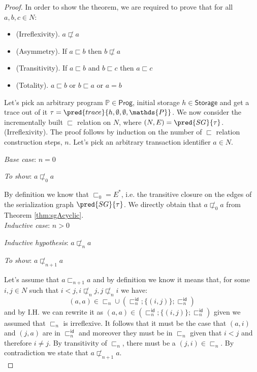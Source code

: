 \begin{proof}
In order to show the theorem, we are required to prove that for all $a, b, c \in N$:
\begin{itemize}
	\item (Irreflexivity). $a \not\sqsubset a$
	\item (Asymmetry). If $a \sqsubset b$ then $b \not\sqsubset a$
	\item (Transitivity). If $a \sqsubset b$ and $b \sqsubset c$ then $a \sqsubset c$
	\item (Totality). $a \sqsubset b$ or $b \sqsubset a$ or $a = b$
\end{itemize}

Let's pick an arbitrary program $\mathds{P} \in \mathsf{Prog}$, initial storage $h \in \mathsf{Storage}$ and get a trace out of it $\tau = \pred{trace}{h, \emptyset, \emptyset, \mathds{P}}$. We now consider the incrementally built $\sqsubset$ relation on $N$, where $(N, E) = \pred{SG}{\tau}$. \\

(Irreflexivity). The proof follows by induction on the number of $\sqsubset$ relation construction steps, $n$. Let's pick an arbitrary transaction identifier $a \in N$.

{\parindent0pt
\textit{Base case}: $n = 0$

\textit{To show}: $a \not\sqsubset_0 a$

By definition we know that $\sqsubset_0 = E^*$, i.e. the transitive closure on the edges of the serialization graph $\pred{SG}{\tau}$. We directly obtain that $a \not\sqsubset_0 a$ from Theorem \ref{thm:sgAcyclic}. \\

\textit{Inductive case}: $n > 0$

\textit{Inductive hypothesis}: $a \not\sqsubset_n a$

\textit{To show}: $a \not\sqsubset_{n+1} a$

Let's assume that $a \sqsubset_{n+1} a$ and by definition we know it means that, for some $i, j \in N$ such that $i < j, i \not\sqsubset_n j, j \not\sqsubset_n i$ we have:
\[
	(a, a) \in \sqsubset_n \cup \left( \sqsubset_n^\mathsf{id} ; \{ (i, j) \} ; \sqsubset_n ^\mathsf{id} \right)
\]
and by I.H. we can rewrite it as $(a, a) \in \left( \sqsubset_n^\mathsf{id} ; \{ (i, j) \} ; \sqsubset_n ^\mathsf{id} \right)$ given we assumed that $\sqsubset_n$ is irreflexive. It follows that it must be the case that $(a, i)$ and $(j, a)$ are in $\sqsubset_n^\mathsf{id}$ and moreover they must be in $\sqsubset_n$ given that $i < j$ and therefore $i \neq j$. By transitivity of $\sqsubset_n$, there must be a $(j, i) \in \sqsubset_n$. By contradiction we state that $a \not\sqsubset_{n+1} a$. \\
}


\end{proof}
